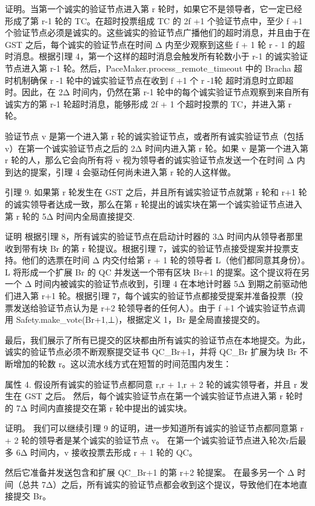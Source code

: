 证明。当第一个诚实的验证节点进入第 r 轮时，如果它不是领导者，它一定已经形成了第 r-1 轮的 TC。在超时投票组成 TC 的 2f +1 个验证节点中，至少 f +1 个验证节点必须是诚实的。这些诚实的验证节点广播他们的超时消息，并且由于在 GST 之后，每个诚实的验证节点在时间 Δ 内至少观察到这些 f + 1 轮 r - 1 的超时消息。根据引理 4，第一个这样的超时消息会触发所有轮数小于 r-1 的诚实验证节点进入第 r-1 轮。然后，PaceMaker.process\_remote\_timeout 中的 Bracha 超时机制确保 r -1 轮中的诚实验证节点在收到 f +1 个 r -1轮  超时消息时立即超时。因此，在 2Δ 时间内，仍然在第 r-1 轮中的每个诚实验证节点观察到来自所有诚实方的第 r-1 轮超时消息，能够形成 2f + 1 个超时投票的 TC，并进入第 r 轮。

验证节点 v 是第一个进入第 r 轮的诚实验证节点，或者所有诚实验证节点（包括 v）在第一个诚实验证节点之后的 2Δ 时间内进入第 r 轮。如果 v 是第一个进入第 r 轮的人，那么它会向所有将 v 视为领导者的诚实验证节点发送一个在时间 Δ 内到达的提案，引理 4 会驱动任何尚未进入第 r 轮的人这样做。

引理 9. 如果第 r 轮发生在 GST 之后，并且所有诚实验证节点就第 r 轮和 r+1 轮的诚实领导者达成一致，那么在第 r 轮提出的诚实块在第一个诚实验证节点进入第 r 轮的 5Δ 时间内全局直接提交.

证明 根据引理 8，所有诚实的验证节点在启动计时器的 3Δ 时间内从领导者那里收到带有块 Br 的第 r 轮提议。根据引理 7，诚实的验证节点接受提案并投票支持。他们的选票在时间 Δ 内交付给第 r + 1 轮的领导者 L（他们都同意其身份）。 L 将形成一个扩展 Br 的 QC 并发送一个带有区块 Br+1 的提案。这个提议将在另一个 Δ 时间内被诚实的验证节点收到，引理 4 在本地计时器 5Δ 到期之前驱动他们进入第 r+1 轮。根据引理 7，每个诚实的验证节点都接受提案并准备投票（投票发送给验证节点认为是 r+2 轮领导者的任何人）。由于 f +1 个诚实验证节点调用 Safety.make\_vote(Br+1,⊥)，根据定义 1，Br 是全局直接提交的。

最后，我们展示了所有已提交的区块都由所有诚实的验证节点在本地提交。为此，诚实的验证节点必须不断观察提交证书 QC\_Br+1，并将 QC\_Br 扩展为块 Br 不断增加的轮数 r。这以流水线方式在短暂的时间范围内发生：

属性 4. 假设所有诚实的验证节点都同意 r,r + 1,r + 2 轮的诚实领导者，并且 r 发生在 GST 之后。 然后，每个诚实验证节点在第一个诚实验证节点进入第 r 轮时的 7Δ 时间内直接提交在第 r 轮中提出的诚实块。

证明。 我们可以继续引理 9 的证明，进一步知道所有诚实的验证节点都同意第 r + 2 轮的领导者是某个诚实的验证节点 v。 在第一个诚实验证节点进入轮次r后最多 6Δ 时间内，v 接收投票去形成 r + 1 轮的 QC。

然后它准备并发送包含和扩展 QC\_Br+1 的第 r+2 轮提案。 在最多另一个 Δ 时间（总共 7Δ）之后，所有诚实的验证节点都会收到这个提议，导致他们在本地直接提交 Br。

